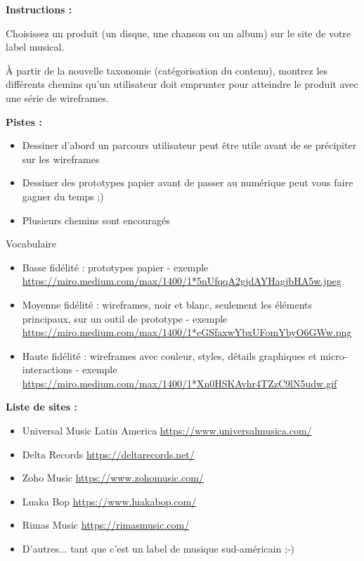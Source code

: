 \makeheaderfiles

\textbf{Instructions :}

Choisissez un produit (un disque, une chanson ou un album) sur le site de votre label musical.

À partir de la nouvelle taxonomie (catégorisation du contenu), montrez les différents chemins qu'un utilisateur doit emprunter pour atteindre le produit avec une série de wireframes.

\textbf{Pistes :}

\begin{itemize}
\item Dessiner d'abord un parcours utilisateur peut être utile avant de se précipiter sur les wireframes
\item Dessiner des prototypes papier avant de passer au numérique peut vous faire gagner du temps ;)
\item Plusieurs chemins sont encouragés
\end{itemize}

Vocabulaire

\begin{itemize}
\item Basse fidélité : prototypes papier - exemple \url{https://miro.medium.com/max/1400/1*5nUfqqA2gjdAYHagjbHA5w.jpeg}
\item Moyenne fidélité : wireframes, noir et blanc, seulement les éléments principaux, sur un outil de prototype - exemple \url{https://miro.medium.com/max/1400/1*eGSfaxwYbxUFomYbyO6GWw.png}
\item Haute fidélité : wireframes avec couleur, styles, détails graphiques et micro-interactions - exemple \url{https://miro.medium.com/max/1400/1*Xn0HSKAvhr4TZzC9lN5udw.gif}
\end{itemize}

\textbf{Liste de sites :}

\begin{itemize}
\item Universal Music Latin America \url{https://www.universalmusica.com/}
\item Delta Records \url{https://deltarecords.net/}
\item Zoho Music \url{https://www.zohomusic.com/}
\item Luaka Bop \url{https://www.luakabop.com/}
\item Rimas Music \url{https://rimasmusic.com/}
\item D'autres... tant que c'est un label de musique sud-américain ;-)
\end{itemize}

